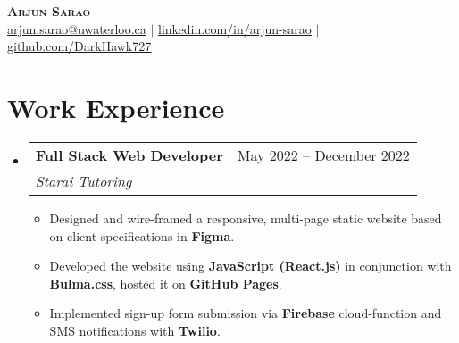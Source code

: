 \documentclass[letterpaper,11pt]{article}
\makeatletter
\newcommand{\resumeItem}[1]{
  \item\small{
    {#1 \vspace{-2pt}}
  }
}
\newcommand{\resumeSubheading}[4]{
  \vspace{-2pt}\item
    \begin{tabular*}{0.97\textwidth}[t]{l@{\extracolsep{\fill}}r}
      \textbf{#1} & #2 \\
      \textit{\small#3} & \textit{\small #4} \\
    \end{tabular*}\vspace{-7pt}
}
\newcommand{\resumeSubSubheading}[2]{
    \item
    \begin{tabular*}{0.97\textwidth}{l@{\extracolsep{\fill}}r}
      \textit{\small#1} & \textit{\small #2} \\
    \end{tabular*}\vspace{-7pt}
}
\newcommand{\resumeSubHeadingListStart}{\begin{itemize}[leftmargin=0.15in, label={}]}
\newcommand{\resumeSubHeadingListEnd}{\end{itemize}}
\newcommand{\resumeItemListStart}{\begin{itemize}}
\newcommand{\resumeItemListEnd}{\end{itemize}\vspace{-5pt}}
\makeatother
\begin{document}

\begin{center}
    {\textbf{\Huge \scshape Arjun Sarao}} \\ \vspace{1pt}
     \href{mailto:arjun.sarao@uwaterloo.ca}{\underline{arjun.sarao@uwaterloo.ca}} $|$ 
    \href{https://www.linkedin.com/in/arjun-sarao-bb555b1b4/}{\underline{linkedin.com/in/arjun-sarao}} $|$
    \href{https://github.com/DarkHawk727}{\underline{github.com/DarkHawk727}}
\end{center}


\section{Work Experience}
  \resumeSubHeadingListStart

    \resumeSubheading
      {Full Stack Web Developer}{May 2022 -- December 2022}
      {Starai Tutoring}{}
      \resumeItemListStart
        \resumeItem{Designed and wire-framed a responsive, multi-page static website based on client specifications in \textbf{Figma}.}
        \resumeItem{Developed the website using \textbf{JavaScript (React.js)} in conjunction with
        \textbf{Bulma.css}, hosted it on \textbf{GitHub Pages}.}
        \resumeItem{Implemented sign-up form submission via \textbf{Firebase} cloud-function and SMS notifications with \textbf{Twilio}.}
      \resumeItemListEnd
      
  \resumeSubHeadingListEnd


\end{document}
